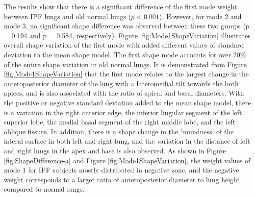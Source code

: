 The results show that there is a significant difference of the first mode weight between IPF lungs and old normal lungs ($p<0.001$). However, for mode 2 and mode 3, no significant shape difference was observed between these two groups (p = 0.194 and p = 0.584, respectively). Figure \ref{fig:Mode1ShapeVariation} illustrates overall shape variation of the first mode with added different values of standard deviation to the mean shape model. The first shape mode accounts for over 20\% of the entire shape variation in old normal lungs. It is demonstrated from Figure \ref{fig:Mode1ShapeVariation} that the first mode relates to the largest change in the anteroposterior diameter of the lung with a lateromedial tilt towards the both apices, and is also associated with the ratio of apical and basal diameters. With the positive or negative standard deviation added to the mean shape model, there is a variation in the right anterior edge, the inferior lingular segment of the left superior lobe, the medial basal segment of the right middle lobe, and the left oblique fissure. In addition, there is a shape change in the ’roundness’ of the lateral surface in both left and right lung, and the variation in the distance of left and right lungs in the apex and base is also observed. As shown in Figure \ref{fig:ShapeDifference-a} and Figure \ref{fig:Mode1ShapeVariation}, the weight values of mode 1 for IPF subjects mostly distributed in negative zone, and the negative weight corresponds to a larger ratio of anteroposterior diameter to lung height compared to normal lungs. 

